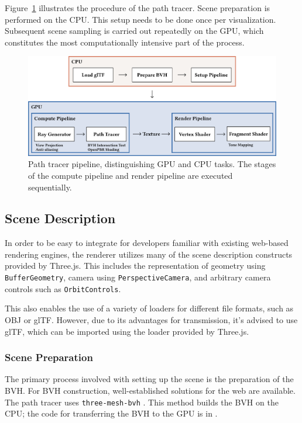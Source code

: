 Figure~\ref{fig:path-tracer} illustrates the procedure of the path tracer. Scene preparation is performed on the \gls{CPU}. This setup needs to be done once per visualization. Subsequent scene sampling is carried out repeatedly on the \gls{GPU}, which constitutes the most computationally intensive part of the process.

\begin{figure}[H]
    \includegraphics[width=1.0\columnwidth]{resources/path-tracer-pipeline.png}
    \caption{Path tracer pipeline, distinguishing \gls{GPU} and \gls{CPU} tasks. The stages of the compute pipeline and render pipeline are executed sequentially.}
    \label{fig:path-tracer}
\end{figure}

\subsection*{Scene Description}

In order to be easy to integrate for developers familiar with existing web-based rendering engines, the renderer utilizes many of the scene description constructs provided by \gls{Three.js}. This includes the representation of geometry using \texttt{BufferGeometry}, camera using \texttt{PerspectiveCamera}, and arbitrary camera controls such as \texttt{OrbitControls}.

This also enables the use of a variety of loaders for different file formats, such as \gls{OBJ} or \gls{glTF}. However, due to its advantages for transmission, it's advised to use \gls{glTF}, which can be imported using the loader provided by \gls{Three.js}.

\subsubsection{Scene Preparation}

The primary process involved with setting up the scene is the preparation of the \gls{BVH}. For \gls{BVH} construction, well-established solutions for the web are available. The path tracer uses \texttt{three-mesh-bvh} \cite{threeMeshBvh}. This method builds the \gls{BVH} on the \gls{CPU}; the code for transferring the \gls{BVH} to the \gls{GPU} is in .

